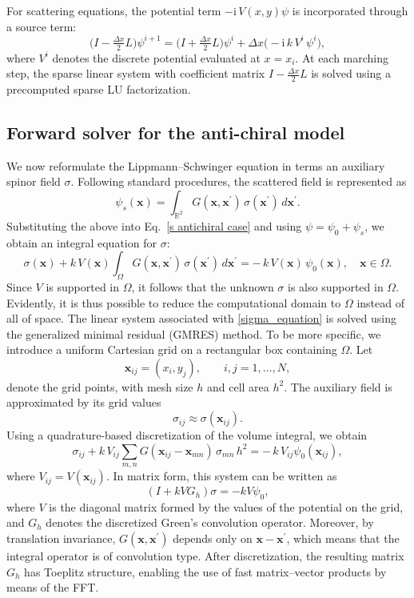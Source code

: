 \documentclass[12pt,reqno]{amsart}
\begin{document}
For scattering equations, the potential term
$-\mathrm{i}\,V(x,y)\psi$ is incorporated through a source term:
\begin{equation*}
\bigl(I-\tfrac{\Delta x}{2}L\bigr)\psi^{i+1}
=
\bigl(I+\tfrac{\Delta x}{2}L\bigr)\psi^{i}
+
\Delta x\bigl(-\mathrm{i}\,k\,V^i\,\psi^{i}\bigr),
\end{equation*}
where $V^i$ denotes the discrete potential evaluated at $x=x_i$.
At each marching step, the sparse linear system with coefficient matrix
$I-\tfrac{\Delta x}{2}L$ is solved using a precomputed sparse LU factorization.

\subsection{Forward solver for the anti-chiral model}
We now reformulate the Lippmann--Schwinger equation in terms an auxiliary spinor field $\sigma$. Following standard procedures, the scattered field is represented as
\[
\psi_s(\mathbf{x})
=
\int_{\mathbb{R}^2}
G(\mathbf{x},\mathbf{x}^{\prime})
\,\sigma(\mathbf{x}^{\prime})
\,d\mathbf{x}^{\prime}.
\]
Substituting the above into Eq.~\eqref{s antichiral case} and using $\psi=\psi_0+\psi_s$, we obtain an integral equation for $\sigma$:
\begin{equation}\label{sigma_equation}
\sigma(\mathbf{x})
+
k\,V(\mathbf{x})
\int_{\Omega}
G(\mathbf{x},\mathbf{x}^{\prime})
\,\sigma(\mathbf{x}^{\prime})
\,d\mathbf{x}^{\prime}
=
-\,k\,V(\mathbf{x})\,\psi_0(\mathbf{x}),
\quad
\mathbf{x}\in\Omega.
\end{equation}
Since $V$ is supported in $\Omega$, it follows that the unknown $\sigma$ is also supported in $\Omega$. Evidently, it is thus possible to reduce the computational domain to $\Omega$ instead of all of space. The linear system associated with \eqref{sigma_equation} is solved using the generalized minimal residual (GMRES) method. To be more specific, we introduce a uniform Cartesian grid on a rectangular box
containing $\Omega$. Let
\[
\mathbf{x}_{ij}=(x_i,y_j),\qquad i,j=1,\ldots,N,
\]
denote the grid points, with mesh size $h$ and cell area $h^2$. The auxiliary field is
approximated by its grid values
\[
\sigma_{ij}\approx \sigma(\mathbf{x}_{ij}).
\]
Using a quadrature-based discretization of the volume integral, we obtain 
\[
\sigma_{ij}
+
k\,V_{ij}
\sum_{m,n}
G(\mathbf{x}_{ij}-\mathbf{x}_{mn})\,\sigma_{mn}\,h^2
=
-\,k\,V_{ij}\psi_0(\mathbf{x}_{ij}),
\]
where $V_{ij}=V(\mathbf{x}_{ij})$. In matrix form, this system can be written as
\[
(I+kVG_h)\sigma=-kV\psi_0,
\]
where $V$ is the diagonal matrix formed by the values of the potential on the grid, and
$G_h$ denotes the discretized Green's convolution operator. Moreover, by translation invariance,
$G(\mathbf{x},\mathbf{x}^{\prime})$ depends only on $\mathbf{x}-\mathbf{x}^{\prime}$,
which means that the integral operator is of convolution type. After discretization, the resulting matrix $G_h$ has Toeplitz structure, enabling the use of fast matrix--vector products by means of the FFT. 
\end{document}
